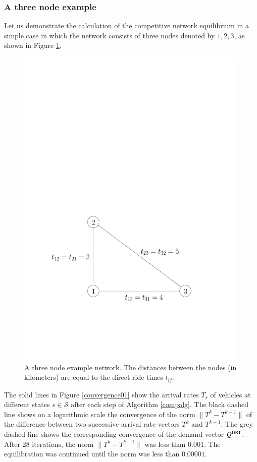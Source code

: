 \documentclass[dissertation,draft*]{aaltoseries}
\begin{document}
\subsubsection{A three node example}
\label{example}
Let us demonstrate the calculation of the competitive network equilibrium in a simple case 
in which the network consists of three nodes denoted by $1,2,3$, as shown in Figure \ref{3node01}. 

\begin{figure}[ht]
\begin{center}
\includegraphics[width=0.4\columnwidth]{3node01}
\caption{A three node example network. The distances between the nodes 
(in kilometers) are equal to the direct ride times $t_{ij}$.}
\label{3node01}
\end{center}
\end{figure}

The solid lines in Figure \ref{convergence01} show the
arrival rates $T_s$ of vehicles at different states $s \in \mathcal{S}$ after each step of Algorithm \ref{compalg}. 
The black dashed line shows on a logarithmic scale the convergence of the norm $\|T^k - T^{k-1}\|$ 
of the difference between two successive arrival rate vectors $T^k$ and $T^{k-1}$.
The grey dashed line shows the corresponding convergence of the demand vector $Q^{\rm DRT}$.
After 28 iterations, the norm $\|T^k - T^{k-1}\|$ was less than $0.001$. 
The equilibration was continued until the norm was less than $0.00001$.
\end{document}

